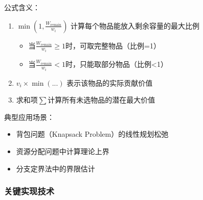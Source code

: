 \documentclass[./../main.tex]{subfiles}
\begin{document}
\noindent 公式含义：
\begin{enumerate}
    \item $\min\left(1,\frac{W_{\text{remain}}}{w_i}\right)$ 计算每个物品能放入剩余容量的最大比例
    \begin{itemize}
        \item 当$\frac{W_{\text{remain}}}{w_i} \geq 1$时，可取完整物品（比例=1）
        \item 当$\frac{W_{\text{remain}}}{w_i} < 1$时，只能取部分物品（比例<1）
    \end{itemize}
    
    \item $v_i \times \min(...)$ 表示该物品的实际贡献价值
    
    \item 求和项$\sum$计算所有未选物品的潜在最大价值
\end{enumerate}

\noindent 典型应用场景：
\begin{itemize}
    \item 背包问题（Knapsack Problem）的线性规划松弛
    \item 资源分配问题中计算理论上界
    \item 分支定界法中的界限估计
\end{itemize}

\subsubsection{关键实现技术}
\begin{algorithm}[H]
\caption{分支限界法通用模板}
\end{algorithm}
\end{document}
